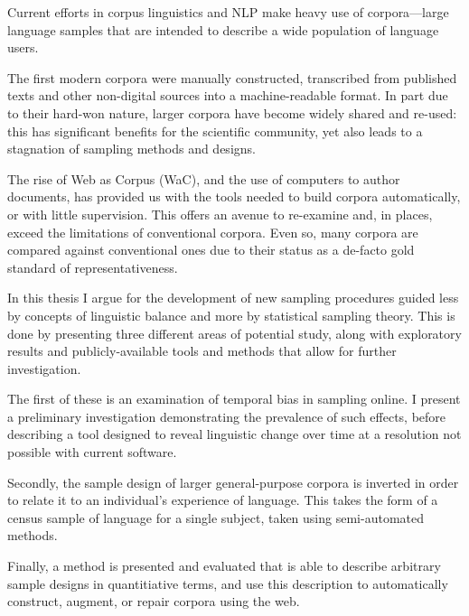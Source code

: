 Current efforts in corpus linguistics and NLP make heavy use of corpora---large language samples that are intended to describe a wide population of language users.


The first modern corpora were manually constructed, transcribed from published texts and other non-digital sources into a machine-readable format.  In part due to their hard-won nature, larger corpora have become widely shared and re-used: this has significant benefits for the scientific community, yet also leads to a stagnation of sampling methods and designs.

The rise of Web as Corpus (WaC), and the use of computers to author documents, has provided us with the tools needed to build corpora automatically, or with little supervision.  
This offers an avenue to re-examine and, in places, exceed the limitations of conventional corpora.  
Even so, many corpora are compared against conventional ones due to their status as a de-facto gold standard of representativeness.


In this thesis I argue for the development of new sampling procedures guided less by concepts of linguistic balance and more by statistical sampling theory.
This is done by presenting three different areas of potential study, along with exploratory results and publicly-available tools and methods that allow for further investigation.

The first of these is an examination of temporal bias in sampling online.  I present a preliminary investigation demonstrating the prevalence of such effects, before describing a tool designed to reveal linguistic change over time at a resolution not possible with current software.

Secondly, the sample design of larger general-purpose corpora is inverted in order to relate it to an individual's experience of language.  This takes the form of a census sample of language for a single subject, taken using semi-automated methods.

Finally, a method is presented and evaluated that is able to describe arbitrary sample designs in quantitiative terms, and use this description to automatically construct, augment, or repair corpora using the web.



